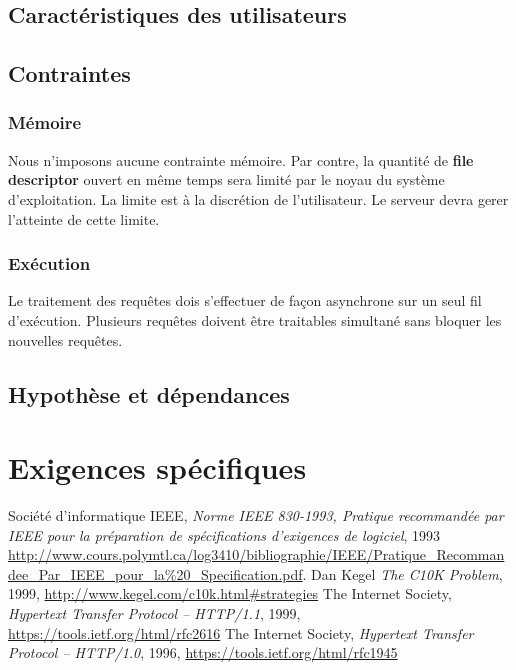 \documentclass{scrreprt}
\begin{document}
\section{Caractéristiques des utilisateurs}

\section{Contraintes}

\subsection{Mémoire}
Nous n'imposons aucune contrainte mémoire. Par contre, la quantité de \textbf{file descriptor} ouvert en même temps sera limité par le noyau du système d'exploitation. La limite est à la discrétion de l'utilisateur. Le serveur devra gerer l'atteinte de cette limite.
\subsection{Exécution}
Le traitement des requêtes dois s'effectuer de façon asynchrone sur un seul fil d'exécution. Plusieurs requêtes doivent être traitables simultané sans bloquer les nouvelles requêtes.


\section{Hypothèse et dépendances}
\chapter{Exigences spécifiques}

\begin{thebibliography}{9}
  Société d'informatique IEEE,
\emph{Norme IEEE 830-1993, Pratique recommandée par IEEE pour la préparation de
spécifications d’exigences de logiciel}, 1993
\url{http://www.cours.polymtl.ca/log3410/bibliographie/IEEE/Pratique_Recommandee_Par_IEEE_pour_la%20_Specification.pdf}.
  Dan Kegel
\emph{The C10K Problem}, 1999, \url{http://www.kegel.com/c10k.html#strategies}
    The Internet Society,
\emph{Hypertext Transfer Protocol -- HTTP/1.1}, 1999,
\url{https://tools.ietf.org/html/rfc2616}
    The Internet Society,
\emph{Hypertext Transfer Protocol -- HTTP/1.0}, 1996,
\url{https://tools.ietf.org/html/rfc1945}
\end{thebibliography}


\end{document}
